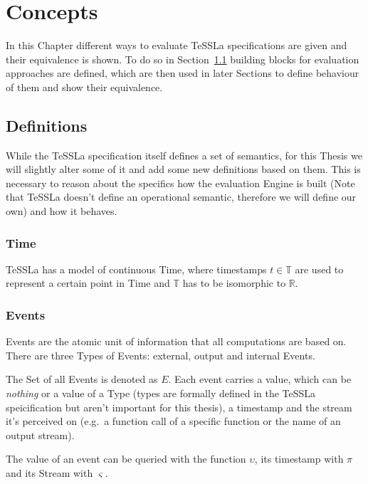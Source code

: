 \chapter{Concepts}
\label{sec:concepts}

In this Chapter different ways to evaluate TeSSLa specifications are given and their equivalence is shown.
To do so in Section~\ref{sec:concepts:defs} building blocks for evaluation approaches are defined, which are then used in later Sections to define behaviour of them and show their equivalence.

\section{Definitions}
\label{sec:concepts:defs}

While the TeSSLa specification itself defines a set of semantics, for this Thesis we will slightly alter some of it and add some new definitions based on them.
This is necessary to reason about the specifics how the evaluation Engine is built (Note that TeSSLa doesn't define an operational semantic, therefore we will define our own) and how it behaves.

\subsection{Time}
\label{sec:concepts:defs:time}

TeSSLa has a model of continuous Time, where timestamps \(t \in \mathbb{T} \) are used to represent a certain point in Time and \(\mathbb{T}\) has to be isomorphic to \(\mathbb{R}\).

\subsection{Events}
\label{sec:concepts:defs:events}

Events are the atomic unit of information that all computations are based on.
There are three Types of Events: external, output and internal Events.

The Set of all Events is denoted as \(E\).
Each event carries a value, which can be \emph{nothing} or a value of a Type (types are formally defined in the TeSSLa speicification but aren't important for this thesis), a timestamp and the stream it's perceived on (e.g.\ a function call of a specific function or the name of an output stream).

The value of an event can be queried with the function \(\upsilon\), its timestamp with \(\pi\) and its Stream with \(\varsigma\).

